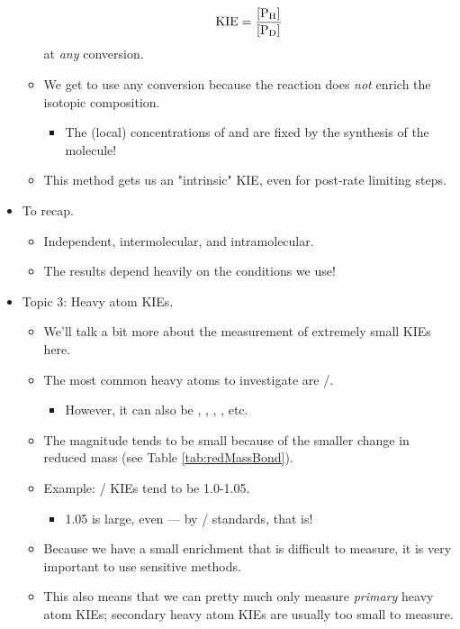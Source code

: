 \documentclass[../notes.tex]{subfiles}
\begin{document}
\begin{itemize}
\begin{itemize}
        \begin{equation*}
            \KIE = \frac{\cnc{P_H}}{\cnc{P_D}}
        \end{equation*}
        at \emph{any} conversion.
        \item We get to use any conversion because the reaction does \emph{not} enrich the isotopic composition.
        \begin{itemize}
            \item The (local) concentrations of  and  are fixed by the synthesis of the molecule!
        \end{itemize}
        \item This method gets us an "intrinsic" KIE, even for post-rate limiting steps.
    \end{itemize}
    \item To recap.
    \begin{itemize}
        \item Independent, intermolecular, and intramolecular.
        \item The results depend heavily on the conditions we use!
    \end{itemize}
    \item Topic 3: Heavy atom KIEs.
    \begin{itemize}
        \item We'll talk a bit more about the measurement of extremely small KIEs here.
        \item The most common heavy atoms to investigate are /.
        \begin{itemize}
            \item However, it can also be , , , , etc.
        \end{itemize}
        \item The magnitude tends to be small because of the smaller change in reduced mass (see Table \ref{tab:redMassBond}).
        \item Example: / KIEs tend to be 1.0-1.05.
        \begin{itemize}
            \item 1.05 is large, even --- by / standards, that is!
        \end{itemize}
        \item Because we have a small enrichment that is difficult to measure, it is very important to use sensitive methods.
        \item This also means that we can pretty much only measure \emph{primary} heavy atom KIEs; secondary heavy atom KIEs are usually too small to measure.

\end{itemize}
\end{itemize}
\end{document}
